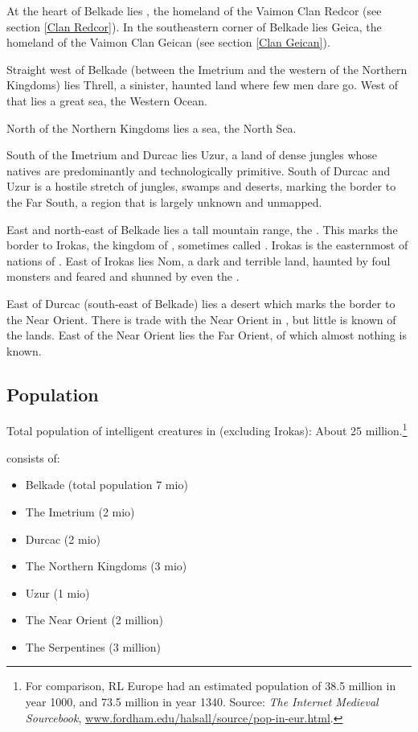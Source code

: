 At the heart of Belkade lies \Redce, the homeland of the Vaimon Clan Redcor (see section \ref{Clan Redcor}). In the southeastern corner of Belkade lies Geica, the homeland of the Vaimon Clan Geican (see section \ref{Clan Geican}). 

Straight west of Belkade (between the Imetrium and the western of the Northern Kingdoms) lies Threll, a sinister, haunted land where few men dare go. West of that lies a great sea, the Western Ocean. 

North of the Northern Kingdoms lies a sea, the North Sea. 

South of the Imetrium and Durcac lies Uzur, a land of dense jungles whose natives are predominantly \meccaran and technologically primitive. South of Durcac and Uzur is a hostile stretch of jungles, swamps and deserts, marking the border to the Far South, a region that is largely unknown and unmapped. 

East and north-east of Belkade lies a tall mountain range, the \Dragonridge. This marks the border to Irokas, the kingdom of \dragons{}, sometimes called \Dragonland. Irokas is the easternmost of nations of \KnownWorld{}. East of Irokas lies Nom, a dark and terrible land, haunted by foul monsters and feared and shunned by even the \dragons{}. 

East of Durcac (south-east of Belkade) lies a desert which marks the border to the Near Orient. There is trade with the Near Orient in \KnownWorld{}, but little is known of the lands. East of the Near Orient lies the Far Orient, of which almost nothing is known. 

\subsection{Population}
Total population of intelligent creatures in \KnownWorld{} (excluding Irokas): About 25 million.\footnote{For comparison, RL Europe had an estimated population of 38.5 million in year 1000, and 73.5 million in year 1340. Source: \emph{The Internet Medieval Sourcebook}, \href{www.fordham.edu/halsall/source/pop-in-eur.html}{www.fordham.edu/halsall/source/pop-in-eur.html}.} 

\KnownWorld{} consists of: 

\begin{itemize}
  \item Belkade (total population 7 mio) 
  \item The Imetrium (2 mio) 
  \item Durcac (2 mio) 
  \item The Northern Kingdoms (3 mio) 
  \item Uzur (1 mio) 
  \item The Near Orient (2 million) 
  \item The Serpentines (3 million)
\end{itemize}


